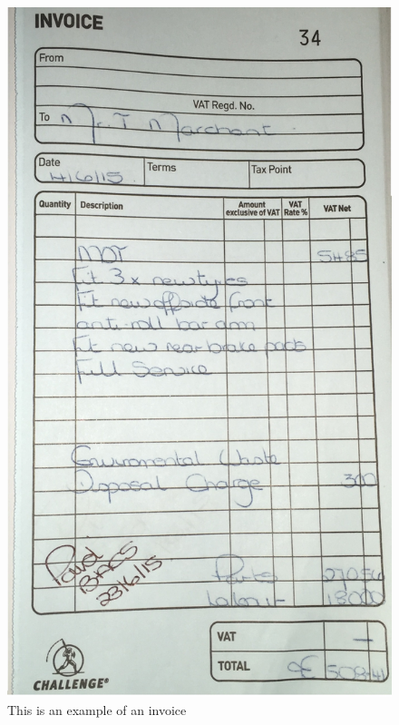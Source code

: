 \documentclass{article}
\begin{document}
	
	\begin{figure}[H]
    
    
    \includegraphics[width=\textwidth]{image_3.jpeg}
    \caption{This is an example of an invoice}
    
    \end{figure}
    \newpage
	
\end{document}
